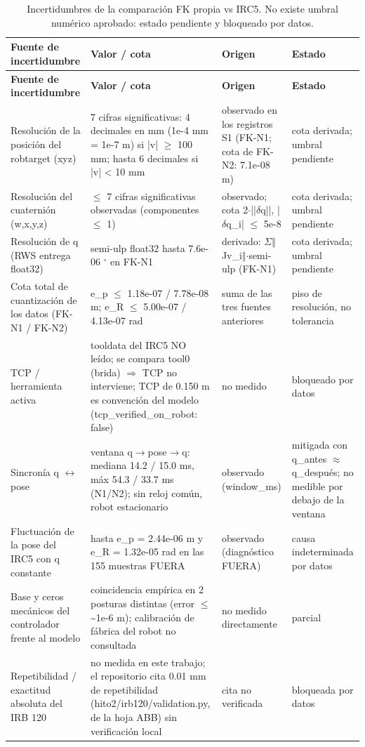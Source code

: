 \begingroup
\scriptsize
\setlength{\tabcolsep}{2.5pt}
\renewcommand{\arraystretch}{1.12}
\begin{longtable}{p{3.6cm}p{6.2cm}p{3cm}p{2.6cm}}
\caption{Incertidumbres de la comparación FK propia vs IRC5. No existe umbral numérico aprobado: estado pendiente y bloqueado por datos.}\label{tab:H}\\
\toprule
\textbf{Fuente de incertidumbre} & \textbf{Valor / cota} & \textbf{Origen} & \textbf{Estado} \\
\midrule
\endfirsthead
\toprule
\textbf{Fuente de incertidumbre} & \textbf{Valor / cota} & \textbf{Origen} & \textbf{Estado} \\
\midrule
\endhead
\bottomrule
\endfoot
Resoluci\'on de la posici\'on del robtarget (xyz) & 7 cifras significativas: 4 decimales en mm (1e-4 mm = 1e-7 m) si |v| $\ge$ 100 mm; hasta 6 decimales si |v| < 10 mm & observado en los registros S1 (FK-N1; cota de FK-N2: 7.1e-08 m) & cota derivada; umbral pendiente \\
Resoluci\'on del cuaterni\'on (w,x,y,z) & $\le$ 7 cifras significativas observadas (componentes $\le$ 1) & observado; cota 2$\cdot$||$\delta$q||, |$\delta$q\_i| $\le$ 5e-8 & cota derivada; umbral pendiente \\
Resoluci\'on de q (RWS entrega float32) & semi-ulp float32 hasta 7.6e-06 $^\circ$ en FK-N1 & derivado: $\Sigma$$\Vert$Jv\_i$\Vert$$\cdot$semi-ulp (FK-N1) & cota derivada; umbral pendiente \\
Cota total de cuantizaci\'on de los datos (FK-N1 / FK-N2) & e\_p $\le$ 1.18e-07 / 7.78e-08 m; e\_R $\le$ 5.00e-07 / 4.13e-07 rad & suma de las tres fuentes anteriores & piso de resoluci\'on, no tolerancia \\
TCP / herramienta activa & tooldata del IRC5 NO le\'ido; se compara tool0 (brida) $\Rightarrow$ TCP no interviene; TCP de 0.150 m es convenci\'on del modelo (tcp\_verified\_on\_robot: false) & no medido & bloqueado por datos \\
Sincron\'ia q $\leftrightarrow$ pose & ventana q$\to$pose$\to$q: mediana 14.2 / 15.0 ms, m\'ax 54.3 / 33.7 ms (N1/N2); sin reloj com\'un, robot estacionario & observado (window\_ms) & mitigada con q\_antes $\approx$ q\_despu\'es; no medible por debajo de la ventana \\
Fluctuaci\'on de la pose del IRC5 con q constante & hasta e\_p = 2.44e-06 m y e\_R = 1.32e-05 rad en las 155 muestras FUERA & observado (diagn\'ostico FUERA) & causa indeterminada por datos \\
Base y ceros mec\'anicos del controlador frente al modelo & coincidencia emp\'irica en 2 posturas distintas (error $\le$ \textasciitilde{}1e-6 m); calibraci\'on de f\'abrica del robot no consultada & no medido directamente & parcial \\
Repetibilidad / exactitud absoluta del IRB 120 & no medida en este trabajo; el repositorio cita 0.01 mm de repetibilidad (hito2/irb120/validation.py, de la hoja ABB) sin verificaci\'on local & cita no verificada & bloqueada por datos \\
\end{longtable}
\endgroup
